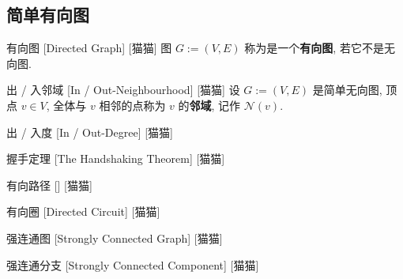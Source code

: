 \documentclass[UTF8]{ctexart}
\begin{document}
        \subsection{简单有向图}

            \begin{dfn}
                []
                {有向图}
                [Directed Graph]
                [猫猫]
                图 \(G:=(V,E)\) 称为是一个\textbf{有向图}, 若它不是无向图. 
            \end{dfn}
            
            \begin{dfn}
                []
                {出 / 入邻域}
                [In / Out-Neighbourhood]
                [猫猫]
                设 \(G:=(V,E)\) 是简单无向图, 顶点 \(v\in V\), 全体与 \(v\) 相邻的点称为 \(v\) 的\textbf{邻域}, 记作 \(\mathcal{N}(v)\). 
            \end{dfn}

            \begin{dfn}
                []
                {出 / 入度}
                [In / Out-Degree]
                [猫猫]
            \end{dfn}
            
            \begin{ppt}
                []
                {握手定理}
                [The Handshaking Theorem]
                [猫猫]
            \end{ppt}
            
            \begin{dfn}
                []
                {有向路径}
                []
                [猫猫]
            \end{dfn}
            
            \begin{dfn}
                []
                {有向圈}
                [Directed Circuit]
                [猫猫]
            \end{dfn}
            
            \begin{dfn}
                []
                {强连通图}
                [Strongly Connected Graph]
                [猫猫]
            \end{dfn}
            
            \begin{dfn}
                []
                {强连通分支}
                [Strongly Connected Component]
                [猫猫]
            \end{dfn}
\end{document}
